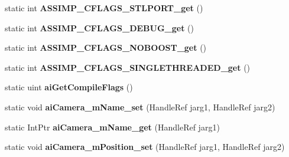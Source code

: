 \begin{DoxyCompactItemize}
\item 
\hypertarget{class_assimp_p_i_n_v_o_k_e_a16ecb2b9074683977b37aeab9b530f1b}{static int {\bfseries A\+S\+S\+I\+M\+P\+\_\+\+C\+F\+L\+A\+G\+S\+\_\+\+S\+T\+L\+P\+O\+R\+T\+\_\+get} ()}\label{class_assimp_p_i_n_v_o_k_e_a16ecb2b9074683977b37aeab9b530f1b}

\item 
\hypertarget{class_assimp_p_i_n_v_o_k_e_a8e4adcfd26cf568d3a0ad8cf0d58fa3c}{static int {\bfseries A\+S\+S\+I\+M\+P\+\_\+\+C\+F\+L\+A\+G\+S\+\_\+\+D\+E\+B\+U\+G\+\_\+get} ()}\label{class_assimp_p_i_n_v_o_k_e_a8e4adcfd26cf568d3a0ad8cf0d58fa3c}

\item 
\hypertarget{class_assimp_p_i_n_v_o_k_e_a71327610e1f69f67a8a195e025935a36}{static int {\bfseries A\+S\+S\+I\+M\+P\+\_\+\+C\+F\+L\+A\+G\+S\+\_\+\+N\+O\+B\+O\+O\+S\+T\+\_\+get} ()}\label{class_assimp_p_i_n_v_o_k_e_a71327610e1f69f67a8a195e025935a36}

\item 
\hypertarget{class_assimp_p_i_n_v_o_k_e_aef2a3c203d262539ac48f65cccb7af7d}{static int {\bfseries A\+S\+S\+I\+M\+P\+\_\+\+C\+F\+L\+A\+G\+S\+\_\+\+S\+I\+N\+G\+L\+E\+T\+H\+R\+E\+A\+D\+E\+D\+\_\+get} ()}\label{class_assimp_p_i_n_v_o_k_e_aef2a3c203d262539ac48f65cccb7af7d}

\item 
\hypertarget{class_assimp_p_i_n_v_o_k_e_a20650e0a0ecb89b6add25e92c23ae901}{static uint {\bfseries ai\+Get\+Compile\+Flags} ()}\label{class_assimp_p_i_n_v_o_k_e_a20650e0a0ecb89b6add25e92c23ae901}

\item 
\hypertarget{class_assimp_p_i_n_v_o_k_e_a26cd4738bc722dc4fb9019e5d444cedc}{static void {\bfseries ai\+Camera\+\_\+m\+Name\+\_\+set} (Handle\+Ref jarg1, Handle\+Ref jarg2)}\label{class_assimp_p_i_n_v_o_k_e_a26cd4738bc722dc4fb9019e5d444cedc}

\item 
\hypertarget{class_assimp_p_i_n_v_o_k_e_a1d32aaa1589405ef66e67c2e8ddbe7b1}{static Int\+Ptr {\bfseries ai\+Camera\+\_\+m\+Name\+\_\+get} (Handle\+Ref jarg1)}\label{class_assimp_p_i_n_v_o_k_e_a1d32aaa1589405ef66e67c2e8ddbe7b1}

\item 
\hypertarget{class_assimp_p_i_n_v_o_k_e_a50b9daafd76aa47eec7c7db42fcdc114}{static void {\bfseries ai\+Camera\+\_\+m\+Position\+\_\+set} (Handle\+Ref jarg1, Handle\+Ref jarg2)}\label{class_assimp_p_i_n_v_o_k_e_a50b9daafd76aa47eec7c7db42fcdc114}


\end{DoxyCompactItemize}
